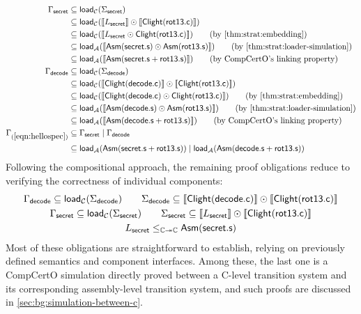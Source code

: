 \begin{align}
  \Gamma_\kw{secret}
  & \subseteq \kw{load}_\C(\Sigma_\kw{secret}) \nonumber\\
  & \subseteq \kw{load}_\C(\llbracket L_\kw{secret} \rrbracket
  \odot \llbracket \kw{Clight}(\kw{rot13.c}) \rrbracket) \nonumber\\
  & \subseteq \kw{load}_\C(\llbracket L_\kw{secret}
  \odot \kw{Clight}(\kw{rot13.c}) \rrbracket) \tag{by \autoref{thm:strat:embedding}}\\
  & \subseteq \kw{load}_\mathcal{A}(\llbracket \kw{Asm}(\kw{secret.s})
  \odot \kw{Asm}(\kw{rot13.s}) \rrbracket)
  \tag{by \autoref{thm:strat:loader-simulation}}
  \\
  & \subseteq \kw{load}_\mathcal{A}(\llbracket \kw{Asm}(\kw{secret.s} + \kw{rot13.s}) \rrbracket)
  \tag{by CompCertO's linking property}
  \\
  \Gamma_\kw{decode}
  & \subseteq \kw{load}_\C(\Sigma_\kw{decode}) \nonumber\\
  & \subseteq \kw{load}_\C(\llbracket \kw{Clight}(\kw{decode.c}) \rrbracket
  \odot \llbracket \kw{Clight}(\kw{rot13.c}) \rrbracket) \nonumber\\
  & \subseteq \kw{load}_\C(\llbracket \kw{Clight}(\kw{decode.c})
  \odot \kw{Clight}(\kw{rot13.c}) \rrbracket) \tag{by \autoref{thm:strat:embedding}}\\
  & \subseteq \kw{load}_\mathcal{A}(\llbracket \kw{Asm}(\kw{decode.s})
  \odot \kw{Asm}(\kw{rot13.s}) \rrbracket) \tag{by \autoref{thm:strat:loader-simulation}}\\
  & \subseteq \kw{load}_\mathcal{A}(\llbracket \kw{Asm}(\kw{decode.s} + \kw{rot13.s}) \rrbracket)
  \tag{by CompCertO's linking property}\\
  \Gamma_{(\ref{eqn:hellospec})}
  & \subseteq \Gamma_\kw{secret} \mid \Gamma_\kw{decode} \nonumber\\
  & \subseteq \kw{load}_\mathcal{A}(\kw{Asm}(\kw{secret.s} + \kw{rot13.s}))
  \mid \kw{load}_\mathcal{A}(\kw{Asm}(\kw{decode.s} + \kw{rot13.s}))\nonumber
\end{align}
Following the compositional approach,
the remaining proof obligations reduce to
verifying the correctness of individual components:
\begin{gather*}
  \Gamma_{ \mathsf{decode} } \subseteq  \mathsf{load} _\mathcal{C}(\Sigma_{ \mathsf{decode} })
  \qquad
  \Sigma_{ \mathsf{decode} } \subseteq
  \llbracket  \mathsf{Clight} ( \mathsf{decode.c} ) \rrbracket \odot \llbracket  \mathsf{Clight} ( \mathsf{rot13.c} ) \rrbracket
  \\
  \Gamma_{ \mathsf{secret} } \subseteq  \mathsf{load} _\mathcal{C}(\Sigma_{ \mathsf{secret} })
  \qquad
  \Sigma_{ \mathsf{secret} } \subseteq
  \llbracket L_{ \mathsf{secret} } \rrbracket \odot \llbracket  \mathsf{Clight} ( \mathsf{rot13.c} ) \rrbracket
  \\
  L_{ \mathsf{secret} } \le_{\mathbb{C} \twoheadrightarrow \mathbb{C}}  \mathsf{Asm} ( \mathsf{secret.s} )
\end{gather*}
Most of these obligations are straightforward to establish,
relying on previously defined semantics and component interfaces.
Among these,
the last one is a CompCertO simulation
directly proved between
a C-level transition system
and its corresponding assembly-level transition system,
and such proofs are discussed in \autoref{sec:bg:simulation-between-c}.

